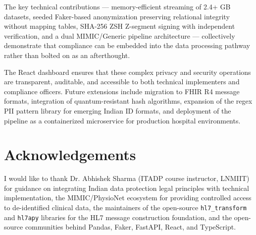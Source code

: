 \documentclass[12pt,a4paper]{report}
\begin{document}
The key technical contributions --- memory-efficient streaming of 2.4+ GB datasets,
seeded Faker-based anonymization preserving relational integrity without mapping
tables, SHA-256 ZSH Z-segment signing with independent verification, and a dual
MIMIC/Generic pipeline architecture --- collectively demonstrate that compliance can
be embedded into the data processing pathway rather than bolted on as an afterthought.

The React dashboard ensures that these complex privacy and security operations are
transparent, auditable, and accessible to both technical implementers and compliance
officers. Future extensions include migration to FHIR R4 message formats, integration
of quantum-resistant hash algorithms, expansion of the regex PII pattern library for
emerging Indian ID formats, and deployment of the pipeline as a containerized
microservice for production hospital environments.

\section{Acknowledgements}

I would like to thank Dr. Abhishek Sharma (ITADP course instructor, LNMIIT) for guidance
on integrating Indian data protection legal principles with technical implementation,
the MIMIC/PhysioNet ecosystem for providing controlled access to de-identified clinical
data, the maintainers of the open-source \texttt{hl7\_transform} and \texttt{hl7apy}
libraries for the HL7 message construction foundation, and the open-source communities
behind Pandas, Faker, FastAPI, React, and TypeScript.
\end{document}
